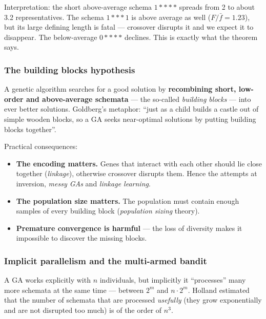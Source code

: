 \documentclass[11pt,a4paper]{article}
\theoremstyle{definition}
\providecommand{\uv}[1]{``#1''}
\begin{document}
Interpretation: the short above-average schema $1{*}{*}{*}{*}$ spreads from 2 to
about 3.2 representatives. The schema $1{*}{*}{*}1$ is above average as well
($F/\bar f = 1.23$), but its large defining length is fatal --- crossover
disrupts it and we expect it to disappear. The below-average
$0{*}{*}{*}{*}$ declines. This is exactly what the theorem says.

\subsubsection{The building blocks hypothesis}

\begin{defbox}
A genetic algorithm searches for a good solution by \textbf{recombining short,
low-order and above-average schemata} --- the so-called \emph{building blocks}
--- into ever better solutions.
Goldberg's metaphor: \uv{just as a child builds a castle out of simple wooden
blocks, so a GA seeks near-optimal solutions by putting building blocks
together}.
\end{defbox}

Practical consequences:
\begin{itemize}
\item \textbf{The encoding matters.} Genes that interact with each other should
  lie close together (\emph{linkage}), otherwise crossover disrupts them. Hence
  the attempts at inversion, \emph{messy GAs} and \emph{linkage learning}.
\item \textbf{The population size matters.} The population must contain enough
  samples of every building block (\emph{population sizing} theory).
\item \textbf{Premature convergence is harmful} --- the loss of diversity makes
  it impossible to discover the missing blocks.
\end{itemize}

\subsubsection{Implicit parallelism and the multi-armed bandit}

\begin{defbox}
A GA works explicitly with $n$ individuals, but implicitly it
\uv{processes} many more schemata at the same time --- between $2^m$ and
$n \cdot 2^m$. Holland estimated that the number of schemata that are processed
\emph{usefully} (they grow exponentially and are not disrupted too much) is of
the order of $n^3$.
\end{defbox}
\end{document}
